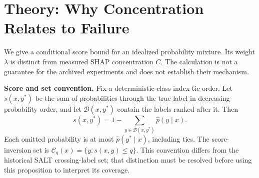 \documentclass[accepted]{uai2026} %
\begin{document}
\section{Theory: Why Concentration Relates to Failure}\label{sec:theory}

We give a conditional score bound for an idealized probability mixture. Its weight $\lambda$ is distinct from measured SHAP concentration $C$. The calculation is not a guarantee for the archived experiments and does not establish their mechanism.

\textbf{Score and set convention.} Fix a deterministic class-index tie order. Let $s(x,y^*)$ be the sum of probabilities through the true label in decreasing-probability order, and let $\mathcal B(x,y^*)$ contain the labels ranked after it. Then
\begin{equation}\label{eq:aps_equiv}
s(x,y^*)=1-\sum_{y\in\mathcal B(x,y^*)}\hat p(y\mid x).
\end{equation}
Each omitted probability is at most $\hat p(y^*\mid x)$, including ties. The score-inversion set is $\mathcal C_q(x)=\{y:s(x,y)\leq q\}$. This convention differs from the historical SALT crossing-label set; that distinction must be resolved before using this proposition to interpret its coverage.
\end{document}
